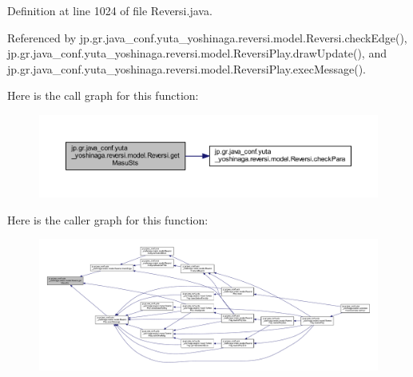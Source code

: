 Definition at line 1024 of file Reversi.\+java.



Referenced by jp.\+gr.\+java\+\_\+conf.\+yuta\+\_\+yoshinaga.\+reversi.\+model.\+Reversi.\+check\+Edge(), jp.\+gr.\+java\+\_\+conf.\+yuta\+\_\+yoshinaga.\+reversi.\+model.\+Reversi\+Play.\+draw\+Update(), and jp.\+gr.\+java\+\_\+conf.\+yuta\+\_\+yoshinaga.\+reversi.\+model.\+Reversi\+Play.\+exec\+Message().

Here is the call graph for this function\+:\nopagebreak
\begin{figure}[H]
\begin{center}
\leavevmode
\includegraphics[width=350pt]{classjp_1_1gr_1_1java__conf_1_1yuta__yoshinaga_1_1reversi_1_1model_1_1_reversi_aaab64f3b70ed5da5f0707933cbf82802_cgraph}
\end{center}
\end{figure}
Here is the caller graph for this function\+:\nopagebreak
\begin{figure}[H]
\begin{center}
\leavevmode
\includegraphics[width=350pt]{classjp_1_1gr_1_1java__conf_1_1yuta__yoshinaga_1_1reversi_1_1model_1_1_reversi_aaab64f3b70ed5da5f0707933cbf82802_icgraph}
\end{center}
\end{figure}
\mbox{\label{classjp_1_1gr_1_1java__conf_1_1yuta__yoshinaga_1_1reversi_1_1model_1_1_reversi_a1a528710342faba65975f4768d24b129}} 
